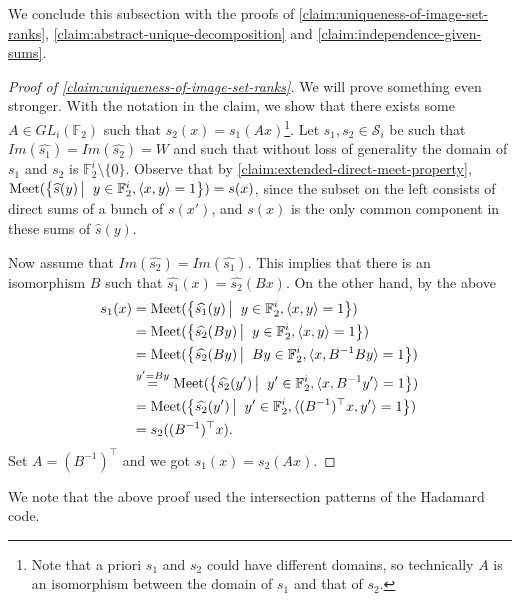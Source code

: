 \documentclass[10pt,a4paper]{article}
\newcommand{\prettyref}[1]{\cref{#1}}
\theoremstyle{definition}
\theoremstyle{remark}
\newcommand\sett[2]{\left\{ #1 \left| \; \vphantom{#1 #2} \right. #2  \right\}}
\newcommand{\set}[1]{\{#1\}}
\newcommand{\iprod}[1]{\langle#1\rangle}
\newcommand{\F}{\mathbb{F}}
\numberwithin{equation}{section}
\let\pref=\prettyref
\def\Meet{\textup{Meet}}
\begin{document}
We conclude this subsection with the proofs of \pref{claim:uniqueness-of-image-set-ranks}, \pref{claim:abstract-unique-decomposition} and \pref{claim:independence-given-sums}.
\begin{proof}[Proof of \pref{claim:uniqueness-of-image-set-ranks}]
    We will prove something even stronger. With the notation in the claim, we show that there exists some \(A \in GL_{i}(\F_2)\) such that \(s_2(x) = s_1(Ax)\)\footnote{Note that a priori \(s_1\) and \(s_2\) could have different domains, so technically \(A\) is an isomorphism between the domain of \(s_1\) and that of \(s_2\).}. Let \(s_1,s_2 \in \mathcal{S}_i\) be such that \(Im(\widehat{s_1})=Im(\widehat{s_2})=W\) and such that without loss of generality the domain of \(s_1\) and \(s_2\) is \(\F_2^i \setminus \set{0}\). Observe that by \pref{claim:extended-direct-meet-property}, \( \Meet(\sett{\widehat{s}(y)}{y \in \F_2^i, \iprod{x,y}=1}) = s(x) \), since the subset on the left consists of direct sums of a bunch of \(s(x')\), and \(s(x)\) is the only common component in these sums of \(\widehat{s}(y)\).

    Now assume that \(Im(\widehat{s_2}) = Im(\widehat{s_1})\). This implies that there is an isomorphism \(B\) such that \(\widehat{s_1}(x)=\widehat{s_2}(Bx)\). On the other hand, by the above
    \begin{align*}
        s_1(x) &= \Meet(\sett{\widehat{s_1}(y)}{y \in \F_2^i, \iprod{x,y}=1})\\
        &=\Meet(\sett{\widehat{s_2}(By)}{y \in \F_2^i, \iprod{x,y}=1})\\
        &=\Meet(\sett{\widehat{s_2}(By)}{By \in \F_2^i, \iprod{x,B^{-1} By}=1})\\
        &\overset{y'=By}{=}\Meet(\sett{\widehat{s_2}(y')}{y' \in \F_2^i, \iprod{x,B^{-1} y'}=1})\\
        &=\Meet(\sett{\widehat{s_2}(y')}{y' \in \F_2^i, \iprod{(B^{-1})^\top x,y'}=1})\\
        &= s_2((B^{-1})^\top x).
    \end{align*}
    Set \(A = (B^{-1})^\top\) and we got \(s_1(x)=s_2(Ax)\).
\end{proof}
We note that the above proof used the intersection patterns of the Hadamard code.
\end{document}
